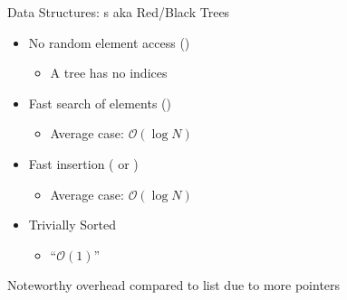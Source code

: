 
\begin{frame}{Data Structures: s aka Red/Black Trees}
%
\begin{itemize}
\item No random element access ()
	\begin{itemize}
	\item A tree has no indices
	\end{itemize}
\item Fast search of elements ()
	\begin{itemize}
	\item Average case: $\mathcal{O}(\log N)$
	\end{itemize}
\item Fast insertion ( or )
	\begin{itemize}
	\item Average case: $\mathcal{O}(\log N)$
	\end{itemize}
\item Trivially Sorted
	\begin{itemize}
	\item \enquote{$\mathcal{O}(1)$}
	\end{itemize}
\end{itemize}
%
\begin{hintbox}
Noteworthy overhead compared to list due to more pointers
\end{hintbox}
%
\end{frame}


